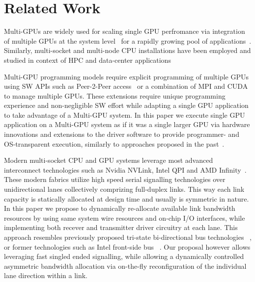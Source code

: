 \section{Related Work}
Multi-GPUs are widely used for scaling single GPU perfromance
via integration of multiple GPUs at the system
level~\cite{pascal-tesla-wp,dgx,intersect360,titan_supercomputer} for a
rapidly growing pool of applications~\cite{coral,cudnn,Lavin15b,SimonyanZ14a}.
Similarly, multi-socket and multi-node CPU
installations have been employed and studied in context of HPC and
data-center applications~\cite{Intel:Xeon,IBM:Power,IBM:z196,AMD:Opteron}

Multi-GPU programming models require explicit programming of multiple GPUs
using SW APIs such as Peer-2-Peer access~\cite{NVIDIAP2P} or a combination of
MPI and CUDA~\cite{NVIDIAMPI} to manage multiple GPUs. These extensions require
unique programming experience and non-negligible SW effort while adapting a
single GPU application to take advantage of a Multi-GPU system. In this paper
we execute single GPU application on a Multi-GPU system as if it was a single
larger GPU via hardware innovations and extensions to the driver software to
provide programmer- and OS-transparent execution, similarly to approaches
proposed in the past~\cite{Cabezas2015,lee2013transparent,ben2015memory}.

Modern multi-socket CPU and GPU systems leverage most advanced interconnect
technologies such as Nvidia NVLink, Intel QPI and AMD
Infinity~\cite{dgx,INTELQPI,AMDINFINITYFABRIC}. These modern fabrics utilize
high speed serial signalling technologies over unidirectional lanes
collectively comprizing full-duplex links. This way each link capacity is
statically allocated at design time and usually is symmetric in nature. In this
paper we propose to dynamically re-allocate available link bandwidth resources
by using same system wire resources and on-chip I/O interfaces, while
implementing both recever and transmitter driver circuitry at each lane. This
approach resembles previously proposed tri-state bi-directional bus
technologies ~\cite{tri-state}, or former technologies such as Intel front-side
bus ~\cite{fsb}. Our proposal however allows leveraging fast
singled ended signalling, while allowing a dynamically controlled
asymmetric bandwidth allocation via on-the-fly reconfiguration of the
individual lane direction within a link.

